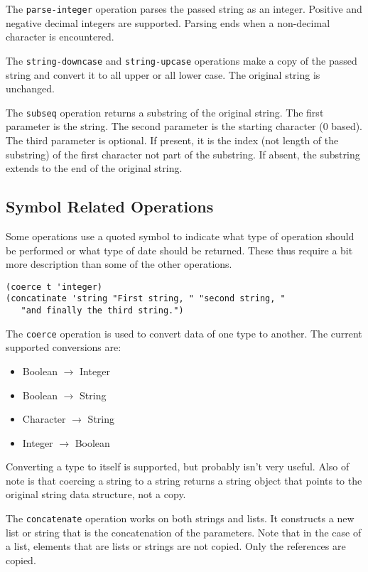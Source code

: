 \documentclass[10pt, openany]{book}
\newcommand{\function}[1]{\texttt{#1}}
\begin{document}
The \function{parse-integer} operation parses the passed string as an integer.  Positive and negative decimal integers are supported.  Parsing ends when a non-decimal character is encountered.

The \function{string-downcase} and \function{string-upcase} operations make a copy of the passed string and convert it to all upper or all lower case.  The original string is unchanged.

The \function{subseq} operation returns a substring of the original string.  The first parameter is the string.  The second parameter is the starting character (0 based).  The third parameter is optional.  If present, it is the index (not length of the substring) of the first character  not part of the substring.  If absent, the substring extends to the end of the original string.

\subsection{Symbol Related Operations}
Some operations use a quoted symbol to indicate what type of operation should be performed or what type of date should be returned.  These thus require a bit more description than some of the other operations.
\begin{lstlisting}
(coerce t 'integer)
(concatinate 'string "First string, " "second string, "
   "and finally the third string.")
\end{lstlisting}

The \function{coerce} operation is used to convert data of one type to another.  The current supported conversions are:
\begin{itemize}
\item Boolean $\rightarrow$ Integer
\item Boolean $\rightarrow$ String
\item Character $\rightarrow$ String
\item Integer $\rightarrow$ Boolean
\end{itemize}

Converting a type to itself is supported, but probably isn't very useful.  Also of note is that coercing a string to a string returns a string object that points to the original string data structure, not a copy.

The \function{concatenate} operation works on both strings and lists.  It constructs a new list or string that is the concatenation of the parameters.  Note that in the case of a list, elements that are lists or strings are not copied.  Only the references are copied.
\end{document}

